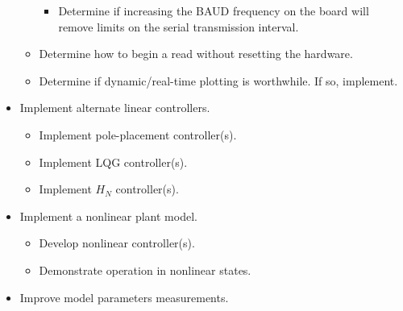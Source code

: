 \documentclass[crop=false,float=true,class=scrreprt]{standalone}
\begin{document}
\begin{itemize}[leftmargin=*]
\begin{itemize}[leftmargin=*, label=$\vcenter{\hbox{\tiny$\bullet$}}$]
\begin{itemize}[leftmargin=*, label=$\cdot$]
    \item Determine if increasing the BAUD frequency on the board will remove limits on the serial transmission interval.
    
  \end{itemize}
    
  \item Determine how to begin a read without resetting the hardware.
  
  \item Determine if dynamic/real-time plotting is worthwhile. If so, implement.
  
\end{itemize}




\clearpage




\item Implement alternate linear controllers.
\begin{itemize}[leftmargin=*, label=$\vcenter{\hbox{\tiny$\bullet$}}$]

  \item Implement pole-placement controller(s).
  
  \item Implement LQG controller(s).
  
  \item Implement $H_{N}$ controller(s).

\end{itemize}


\item Implement a nonlinear plant model.
\begin{itemize}[leftmargin=*, label=$\vcenter{\hbox{\tiny$\bullet$}}$]

  \item Develop nonlinear controller(s).
  
  \item Demonstrate operation in nonlinear states.\\
        {\fns{}}

\end{itemize}


\item Improve model parameters measurements.
\begin{itemize}[leftmargin=*, label=$\vcenter{\hbox{\tiny$\bullet$}}$]


\end{itemize}
\end{itemize}
\end{document}
